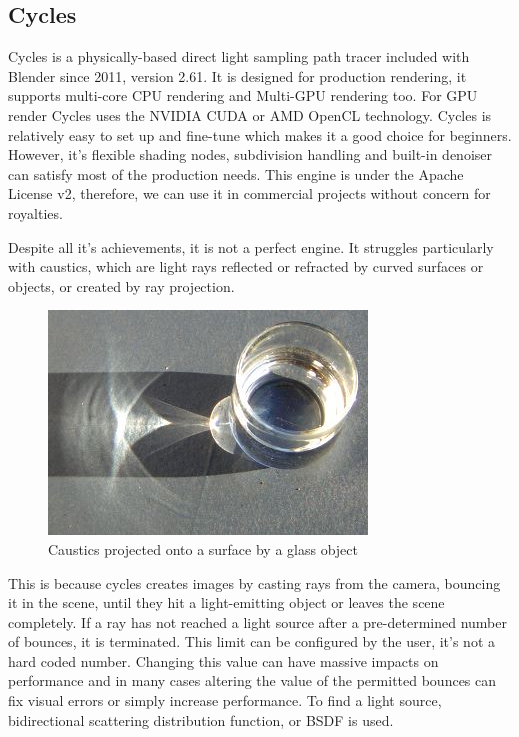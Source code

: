 \documentclass[conference]{IEEEtran}
\begin{document}
\subsection{Cycles} \label{cycles_section}

Cycles is a physically-based direct light sampling path tracer included with Blender since 2011, version 2.61. It is designed for production rendering, it supports multi-core CPU rendering and Multi-GPU rendering too. For GPU render Cycles uses the NVIDIA CUDA or AMD OpenCL technology.
Cycles is relatively easy to set up and fine-tune which makes it a good choice for beginners.\cite{blenderCyclesIntro} However, it's flexible shading nodes, subdivision handling and built-in denoiser can satisfy most of the production needs. This engine is under the Apache License v2,\cite{cyclesFeatures} therefore, we can use it in commercial projects without concern for royalties.\cite{apacheLicense}


Despite all it's achievements, it is not a perfect engine. It struggles particularly with caustics, which are light rays reflected or refracted by curved surfaces or objects, or created by ray projection. 

\begin{figure}
\centerline{\includegraphics[scale=0.6]{Images/caustics.jpg}}
\caption{Caustics projected onto a surface by a glass object}
\label{causticsIRL}
\end{figure}

This is because cycles creates images by casting rays from the camera, bouncing it in the scene, until they hit a light-emitting object or leaves the scene completely. If a ray has not reached a light source after a pre-determined number of bounces, it is terminated. This limit can be configured by the user, it's not a hard coded number. Changing this value can have massive impacts on performance and in many cases altering the value of the permitted bounces can fix visual errors or simply increase performance. To find a light source, bidirectional scattering distribution function, or BSDF is used.\\\\
\end{document}
